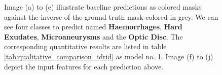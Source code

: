\begin{figure}[H]
  \caption[Quantitative baseline analysis for the \ac{IDRID}]{Image (a) to (e) illustrate baseline predictions as colored masks against the inverse of the ground truth mask colored in grey. We can see four classes to predict named \textbf{\textcolor{rwucyan40}{Haemorrhages}}, \textbf{\textcolor{hardexudates}{Hard Exudates}}, \textbf{\textcolor{microaneurysms}{Microaneurysms}} and the \textbf{\textcolor{rwuviolet}{Optic Disc}}. The corresponding quantitative results are listed in table \ref{tab:qualitative_comparison_idrid} as model no. 1. Image (f) to (j) depict the input features for each prediction above.}
  \label{ce_idrid_baseV2}
\end{figure}

